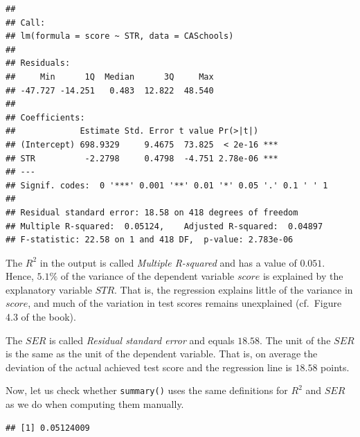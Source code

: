 \documentclass[]{book}
\newenvironment{Shaded}{\begin{snugshade}}{\end{snugshade}}
\newcommand{\KeywordTok}[1]{\textcolor[rgb]{0.13,0.29,0.53}{\textbf{#1}}}
\newcommand{\DecValTok}[1]{\textcolor[rgb]{0.00,0.00,0.81}{#1}}
\newcommand{\StringTok}[1]{\textcolor[rgb]{0.31,0.60,0.02}{#1}}
\newcommand{\CommentTok}[1]{\textcolor[rgb]{0.56,0.35,0.01}{\textit{#1}}}
\newcommand{\OperatorTok}[1]{\textcolor[rgb]{0.81,0.36,0.00}{\textbf{#1}}}
\newcommand{\NormalTok}[1]{#1}
\theoremstyle{definition}
\theoremstyle{definition}
\theoremstyle{definition}
\theoremstyle{remark}
\begin{document}
\begin{verbatim}
## 
## Call:
## lm(formula = score ~ STR, data = CASchools)
## 
## Residuals:
##     Min      1Q  Median      3Q     Max 
## -47.727 -14.251   0.483  12.822  48.540 
## 
## Coefficients:
##             Estimate Std. Error t value Pr(>|t|)    
## (Intercept) 698.9329     9.4675  73.825  < 2e-16 ***
## STR          -2.2798     0.4798  -4.751 2.78e-06 ***
## ---
## Signif. codes:  0 '***' 0.001 '**' 0.01 '*' 0.05 '.' 0.1 ' ' 1
## 
## Residual standard error: 18.58 on 418 degrees of freedom
## Multiple R-squared:  0.05124,    Adjusted R-squared:  0.04897 
## F-statistic: 22.58 on 1 and 418 DF,  p-value: 2.783e-06
\end{verbatim}

The \(R^2\) in the output is called \emph{Multiple R-squared} and has a
value of \(0.051\). Hence, \(5.1 \%\) of the variance of the dependent
variable \(score\) is explained by the explanatory variable \(STR\).
That is, the regression explains little of the variance in \(score\),
and much of the variation in test scores remains unexplained (cf.~Figure
4.3 of the book).

The \(SER\) is called \emph{Residual standard error} and equals
\(18.58\). The unit of the \(SER\) is the same as the unit of the
dependent variable. That is, on average the deviation of the actual
achieved test score and the regression line is \(18.58\) points.

Now, let us check whether \texttt{summary()} uses the same definitions
for \(R^2\) and \(SER\) as we do when computing them manually.

\begin{Shaded}
\end{Shaded}

\begin{verbatim}
## [1] 0.05124009
\end{verbatim}
\end{document}
